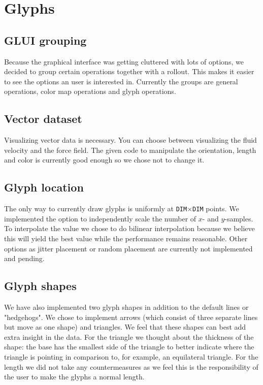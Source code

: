 \section{Glyphs}
 \subsection*{GLUI grouping}
 Because the graphical interface was getting cluttered with lots of options, we decided to group certain operations together with a rollout. This makes it easier to see the options an user is interested in. Currently the groups are general operations, color map operations and glyph operations.
 \subsection*{Vector dataset}
 Visualizing vector data is necessary. You can choose between visualizing the fluid velocity and the force field. The given code to manipulate the orientation, length and color is currently good enough so we chose not to change it. 
 \subsection*{Glyph location}
 The only way to currently draw glyphs is uniformly at \texttt{DIM}$\times$\texttt{DIM} points. We implemented the option to independently scale the number of $x$- and $y$-samples. To interpolate the value we chose to do bilinear interpolation because we believe this will yield the best value while the performance remains reasonable. Other options as jitter placement or random placement are currently not implemented and pending. 
 \subsection*{Glyph shapes}
 We have also implemented two glyph shapes in addition to the default lines or "hedgehogs". We chose to implement arrows (which consist of three separate lines but move as one shape) and triangles. We feel that these shapes can best add extra insight in the data. For the triangle we thought about the thickness of the shape: the base has the smallest side of the triangle to better indicate where the triangle is pointing in comparison to, for example, an equilateral triangle. For the length we did not take any countermeasures as we feel this is the responsibility of the user to make the glyphs a normal length. 
